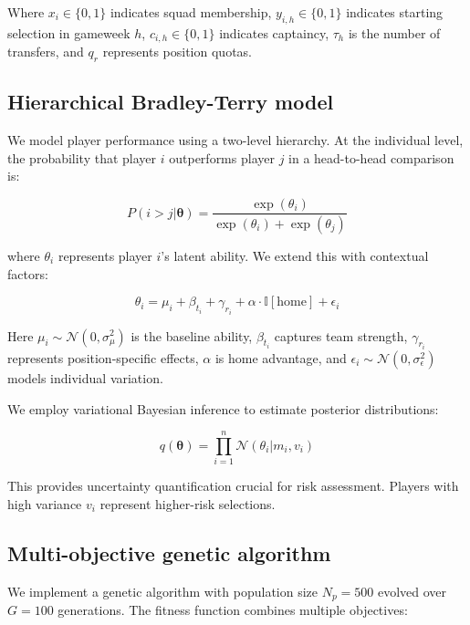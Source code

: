 \documentclass[10pt,a4paper]{article}
\begin{document}
Where $x_i \in \{0,1\}$ indicates squad membership, $y_{i,h} \in \{0,1\}$ indicates starting selection in gameweek $h$, $c_{i,h} \in \{0,1\}$ indicates captaincy, $\tau_h$ is the number of transfers, and $q_r$ represents position quotas.

\subsection*{Hierarchical Bradley-Terry model}

We model player performance using a two-level hierarchy. At the individual level, the probability that player $i$ outperforms player $j$ in a head-to-head comparison is:

\begin{equation}
P(i > j | \boldsymbol{\theta}) = \frac{\exp(\theta_i)}{\exp(\theta_i) + \exp(\theta_j)}
\end{equation}

where $\theta_i$ represents player $i$'s latent ability. We extend this with contextual factors:

\begin{equation}
\theta_i = \mu_i + \beta_{t_i} + \gamma_{r_i} + \alpha \cdot \mathbb{I}[\text{home}] + \epsilon_i
\end{equation}

Here $\mu_i \sim \mathcal{N}(0, \sigma^2_\mu)$ is the baseline ability, $\beta_{t_i}$ captures team strength, $\gamma_{r_i}$ represents position-specific effects, $\alpha$ is home advantage, and $\epsilon_i \sim \mathcal{N}(0, \sigma^2_\epsilon)$ models individual variation.

We employ variational Bayesian inference to estimate posterior distributions:

\begin{equation}
q(\boldsymbol{\theta}) = \prod_{i=1}^{n} \mathcal{N}(\theta_i | m_i, v_i)
\end{equation}

This provides uncertainty quantification crucial for risk assessment. Players with high variance $v_i$ represent higher-risk selections.

\subsection*{Multi-objective genetic algorithm}

We implement a genetic algorithm with population size $N_p = 500$ evolved over $G = 100$ generations. The fitness function combines multiple objectives:
\end{document}
